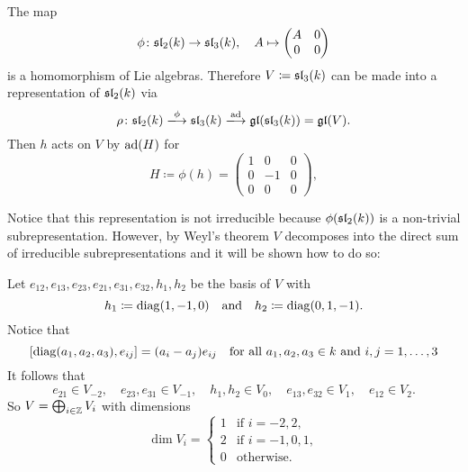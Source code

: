 \begin{expl}
 The map
 \[
  \phi \colon \mathfrak{sl}_2(k) \to \mathfrak{sl}_3(k), \quad
  A \mapsto \begin{pmatrix} A & 0 \\ 0 & 0 \end{pmatrix}
 \]
 is a homomorphism of Lie algebras. Therefore $V \coloneqq \mathfrak{sl}_3(k)$ can be made into a representation of $\mathfrak{sl}_2(k)$ via
 \[
  \rho \colon \sll_2(k) \xlongrightarrow{\phi} \sll_3(k) \xlongrightarrow{\ad} \gl(\sll_3(k)) = \gl(V).
 \]
 Then $h$ acts on $V$ by $\operatorname{ad}(H)$ for
 \[
  H \coloneqq \phi(h) =
  \begin{pmatrix}
   1 &  0 & 0 \\
   0 & -1 & 0 \\
   0 &  0 & 0
  \end{pmatrix},
 \]

 Notice that this representation is not irreducible because $\phi(\mathfrak{sl}_2(k))$ is a non-trivial subrepresentation. However, by Weyl’s theorem $V$ decomposes into the direct sum of irreducible subrepresentations and it will be shown how to do so:
 
 Let $e_{12}, e_{13}, e_{23}, e_{21}, e_{31}, e_{32}, h_1, h_2$ be the basis of $V$ with
 \[
  h_1 \coloneqq \operatorname{diag}(1, -1, 0) \quad\text{and}\quad h_2 \coloneqq \operatorname{diag}(0, 1, -1).
 \]
 Notice that
 \[
  [\operatorname{diag}(a_1, a_2, a_3), e_{ij}] = (a_i-a_j) e_{ij}
  \quad\text{for all $a_1, a_2, a_3 \in k$ and $i,j = 1, \dotsc, 3$}
 \]
 It follows that
 \[
  e_{21} \in V_{-2}, \quad
  e_{23}, e_{31} \in V_{-1}, \quad
  h_1, h_2 \in V_0, \quad
  e_{13}, e_{32} \in V_1, \quad
  e_{12} \in V_2.
 \]
 So $V = \bigoplus_{i \in \mathbb{Z}} V_i$ with dimensions
 \begin{equation}\label{eqn: dimensions of eigenspaces of sl3}
  \dim V_i =
  \begin{cases}
   1 & \text{if $i = -2, 2$}, \\
   2 & \text{if $i = -1, 0, 1$}, \\
   0 & \text{otherwise}.
  \end{cases}
 \end{equation}
 

\end{expl}
